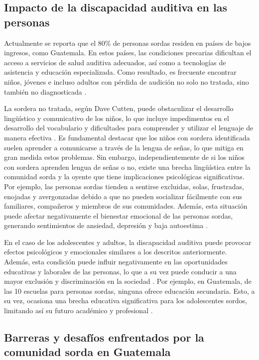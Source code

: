 \subsection{Impacto de la discapacidad auditiva en las personas}

Actualmente se reporta que el 80\% de personas sordas residen en países de bajos ingresos, como Guatemala. En estos países, las condiciones precarias dificultan el acceso a servicios de salud auditiva adecuados, así como a tecnologías de asistencia y educación especializada. Como resultado, es frecuente encontrar niños, jóvenes e incluso adultos con pérdida de audición no solo no tratada, sino también no diagnosticada \cite{six}.

La sordera no tratada, según Dave Cutten, puede obstaculizar el desarrollo lingüístico y comunicativo de los niños, lo que incluye impedimentos en el desarrollo del vocabulario y dificultades para comprender y utilizar el lenguaje de manera efectiva \cite{nine}. Es fundamental destacar que los niños con sordera identificada suelen aprender a comunicarse a través de la lengua de señas, lo que mitiga en gran medida estos problemas. Sin embargo, independientemente de si los niños con sordera aprenden lengua de señas o no, existe una brecha lingüística entre la comunidad sorda y la oyente que tiene implicaciones psicológicas significativas. Por ejemplo, las personas sordas tienden a sentirse excluidas, solas, frustradas, enojadas y avergonzadas debido a que no pueden socializar fácilmente con sus familiares, compañeros y miembros de sus comunidades. Además, esta situación puede afectar negativamente el bienestar emocional de las personas sordas, generando sentimientos de ansiedad, depresión y baja autoestima \cite{ten}.

En el caso de los adolescentes y adultos, la discapacidad auditiva puede provocar efectos psicológicos y emocionales similares a los descritos anteriormente. Además, esta condición puede influir negativamente en las oportunidades educativas y laborales de las personas, lo que a su vez puede conducir a una mayor exclusión y discriminación en la sociedad \cite{eleven}. Por ejemplo, en Guatemala, de las 10 escuelas para personas sordas, ninguna ofrece educación secundaria. Esto, a su vez, ocasiona una brecha educativa significativa para los adolescentes sordos, limitando así su futuro académico y profesional \cite{four}.


\subsection{Barreras y desafíos enfrentados por la comunidad sorda en Guatemala}

